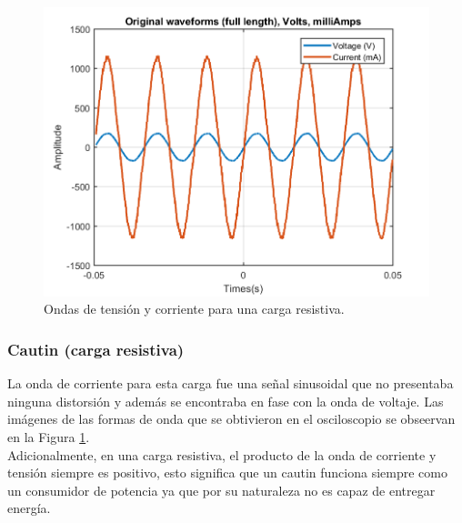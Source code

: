 \documentclass[journal]{IEEEtran}
\begin{document}

\begin{figure}[h]
\centering
\includegraphics[clip,width=\columnwidth]{original_waveform_cautin.png}
\caption{Ondas de tensión y corriente para una carga
resistiva.}
\label{original_resistive_load}
\end{figure}

\subsubsection{Cautin (carga resistiva)}
La onda de corriente para esta carga fue una señal 
sinusoidal que no presentaba ninguna distorsión y además 
se encontraba en fase con la onda de voltaje. Las imágenes
de las formas de onda que se obtivieron en el osciloscopio 
se obseervan en la Figura \ref{original_resistive_load}. \\


Adicionalmente, en una carga resistiva, el producto de la 
onda de corriente y tensión siempre es positivo, esto 
significa que un cautin funciona siempre como un 
consumidor de potencia ya que por su naturaleza no es 
capaz de entregar energía. \\
\end{document}
